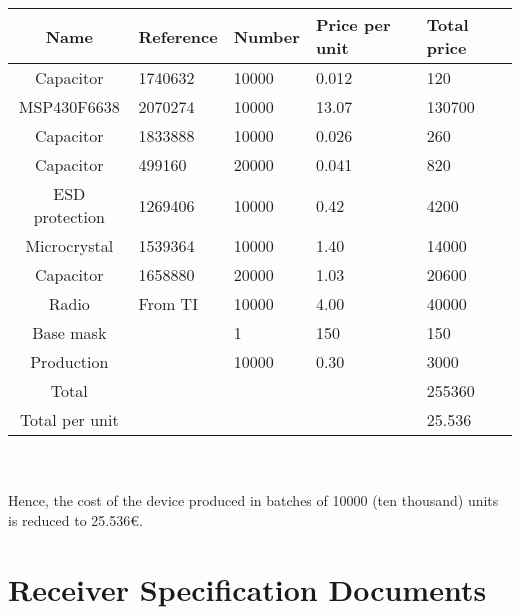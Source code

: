 \begin{tabular}{| c |l | l | l | l |} 
		\hline
		Name & Reference & Number & Price per unit & Total price\\ \hline
	 	Capacitor & 1740632 & 10000 & 0.012  & 120\\ \hline
	 	MSP430F6638 & 2070274 & 10000 & 13.07 & 130700\\ \hline
	 	Capacitor & 1833888 & 10000 & 0.026  & 260\\ \hline
	 	Capacitor & 499160 & 20000 & 0.041  & 820\\ \hline
	 	ESD protection & 1269406 & 10000 & 0.42  & 4200\\ \hline
	 	Microcrystal & 1539364 & 10000 & 1.40 & 14000\\ \hline
	 	Capacitor & 1658880 & 20000 & 1.03  & 20600\\ \hline
	 	Radio & From TI & 10000 & 4.00 & 40000\\ \hline
		Base mask &  & 1 & 150 & 150\\ \hline
		Production &  & 10000 & 0.30 & 3000\\ \hline
	 	Total &  &  &  & 255360\\ \hline
	 	Total per unit &  &  &  & 25.536\\	\hline
\end{tabular}\\\\

	Hence, the cost of the device produced in batches of 10000 (ten thousand) units is reduced to 25.536{\small \euro}.


\chapter{Receiver Specification Documents}
\label{ch:specs}

